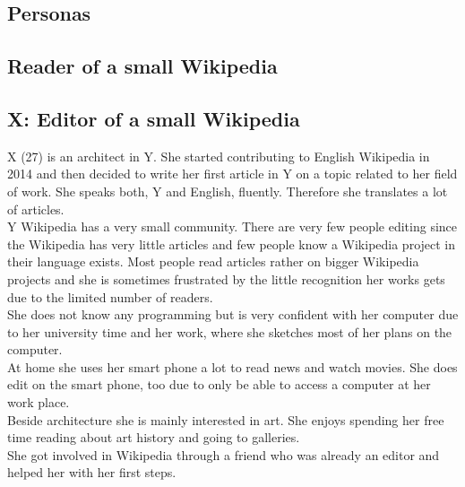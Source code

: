 \documentclass[11pt]{article}
\begin{document}
\subsection{Personas}

\subsection{Reader of a small Wikipedia}

\subsection{X: Editor of a small Wikipedia}
X (27) is an architect in Y. She started contributing to English Wikipedia in 2014 and then decided to write her first article in Y on a topic related to her field of work. She speaks both, Y and English, fluently. Therefore she translates a lot of articles. \\
Y Wikipedia has a very small community. There are very few people editing since the Wikipedia has very little articles and few people know a Wikipedia project in their language exists. Most people read articles rather on bigger Wikipedia projects and she is sometimes frustrated by the little recognition her works gets due to the limited number of readers. \\
She does not know any programming but is very confident with her computer due to her university time and her work, where she sketches most of her plans on the computer. \\
At home she uses her smart phone a lot to read news and watch movies. She does edit on the smart phone, too due to only be able to access a computer at her work place. \\  
Beside architecture she is mainly interested in art. She enjoys spending her free time reading about art history and going to galleries. \\
She got involved in Wikipedia through a friend who was already an editor and helped her with her first steps.
\end{document}
